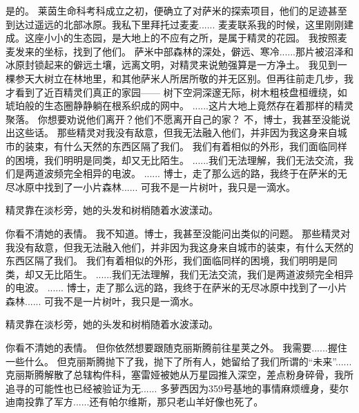 \documentclass[openany]{book}
\begin{document}
\begin{dialogue}
     是的。
     莱茵生命科考科成立之初，便确立了对萨米的探索项目，他们的足迹甚至到达过遥远的北部冰原。我私下里拜托过麦麦......
     麦麦联系我的时候，这里刚刚建成。这座小小的生态园，是大地上的不应有之所，是属于精灵的花园。
     我按照麦麦发来的坐标，找到了他们。
     萨米中部森林的深处，僻远、寒冷......那片被沼泽和冰原封锁起来的僻远土壤，远离文明，对精灵来说勉强算是一方净土。
     我见到一棵参天大树立在林地里，和其他萨米人所居所敬的并无区别。但再往前走几步，我才看到了近百精灵们真正的家园——
     树下空洞深邃无际，树木粗枝盘桓缠绕，如琥珀般的生态圈静静躺在根系织成的网中。
     ......这片大地上竟然存在着那样的精灵聚落。
     你想要劝说他们离开？他们不愿离开自己的家？
     不，博士，我甚至没能说出这些话。
     那些精灵对我没有敌意，但我无法融入他们，并非因为我这身来自城市的装束，有什么天然的东西区隔了我们。
     我们有着相似的外形，我们面临同样的困境，我们明明是同类，却又无比陌生。
     ......我们无法理解，我们无法交流，我们是两道波频完全相异的电波。
     ......
     博士，走了那么远的路，我终于在萨米的无尽冰原中找到了一小片森林......
     可我不是一片树叶，我只是一滴水。\par
    精灵靠在淡杉旁，她的头发和树梢随着水波漾动。\par
    你看不清她的表情。
     我不知道。博士，我甚至没能问出类似的问题。
     那些精灵对我没有敌意，但我无法融入他们，并非因为我这身来自城市的装束，有什么天然的东西区隔了我们。
     我们有着相似的外形，我们面临同样的困境，我们明明是同类，却又无比陌生。
     ......我们无法理解，我们无法交流，我们是两道波频完全相异的电波。
     ......
     博士，走了那么远的路，我终于在萨米的无尽冰原中找到了一小片森林......
     可我不是一片树叶，我只是一滴水。\par
    精灵靠在淡杉旁，她的头发和树梢随着水波漾动。\par
    你看不清她的表情。
     但你依然想要跟随克丽斯腾前往星荚之外。
     我需要......握住一些什么。
     但克丽斯腾抛下了我，抛下了所有人，她留给了我们所谓的“未来”......
     克丽斯腾解散了总辖构件科，塞雷娅被她从万星园推入深空，差点粉身碎骨，我所追寻的可能性也已经被验证为无......
     多萝西因为359号基地的事情麻烦缠身，斐尔迪南投靠了军方......还有帕尔维斯，那只老山羊好像也死了。

\end{dialogue}
\end{document}
